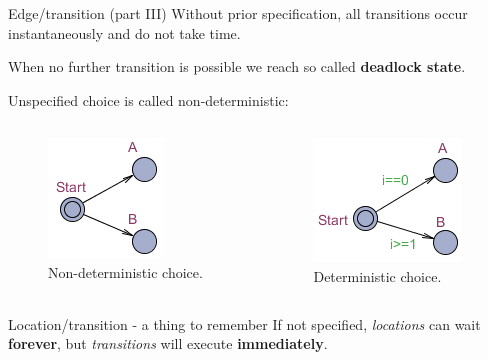 \documentclass{beamer}
\begin{document}
\begin{frame}{Edge/transition (part III)}
	Without prior specification, all transitions occur instantaneously and do not take time.\newline
	
	When no further transition is possible we reach so called \textbf{deadlock state}.\newline
	
	Unspecified choice is called non-deterministic:\newline
	\vspace{-8mm}
	\begin{columns}
		\begin{column}{.5\textwidth}
			\begin{figure}[H]
				\label{img:ndc}
				\includegraphics[scale=0.7]{img/uppaal_non_deterministic_choice.png}
				\caption{Non-deterministic choice.}
			\end{figure}
		\end{column}
		\begin{column}{.5\textwidth}
			\begin{figure}[H]
				\label{img:dc}
				\includegraphics[scale=0.7]{img/uppaal_deterministic_choice.png}
				\caption{Deterministic choice.}
			\end{figure}
		\end{column}		
	\end{columns}
\end{frame}

\begin{frame}{Location/transition - a thing to remember}
	If not specified, \textit{locations} can wait \textbf{forever}, but \textit{transitions} will execute \textbf{immediately}.
\end{frame}
\end{document}
